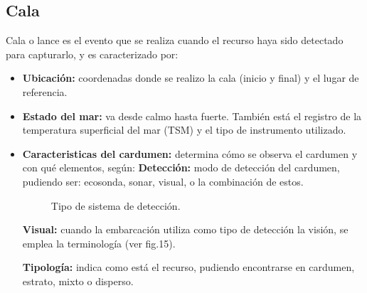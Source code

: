 \documentclass[a4paper,oneside,11pt]{book}
\begin{document}
\subsection{Cala}
Cala o lance es el evento que se realiza cuando el recurso haya sido detectado para capturarlo, y es caracterizado por:
\begin{itemize}
\item{\textbf{Ubicación:}} 
coordenadas donde se realizo la cala (inicio y final) y el lugar de referencia.
\item{\textbf{Estado del mar:}} 
 va desde calmo hasta fuerte. También está el registro de la temperatura superficial del mar (TSM) y el tipo de instrumento utilizado.
\item{\textbf{Caracteristicas del cardumen:}} 
determina  cómo se observa el cardumen y con qué elementos, según:
\subitem \textbf{Detección:} 
modo de detección del cardumen, pudiendo ser: ecosonda, sonar, visual, o la combinación de estos.
 \begin{figure}[htbp]
 	\centering
  	\caption{Tipo de sistema de detección.}
  \end{figure}

\subitem \textbf{Visual:} cuando la embarcación utiliza como tipo de detección la visión, se emplea la terminología (ver fig.15).

\subitem \textbf{Tipología:} indica como está el recurso, pudiendo encontrarse en cardumen, estrato, mixto o disperso.


\end{itemize}
\end{document}
